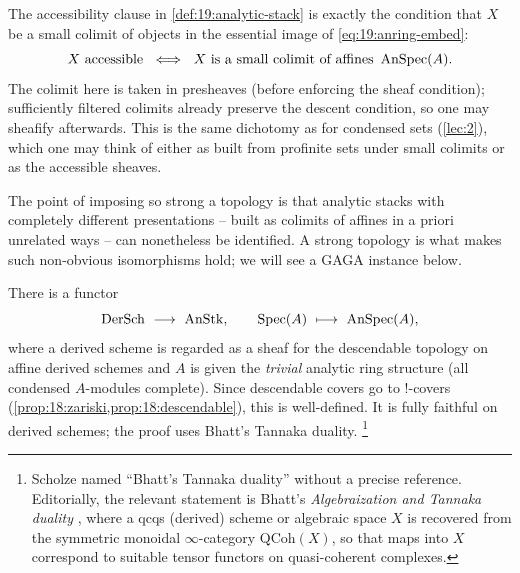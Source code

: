\begin{remark}
\label{rmk:19:accessible-colimit}
The accessibility clause in \cref{def:19:analytic-stack} is exactly the
condition that $X$ be a small colimit of objects in the essential image of
\eqref{eq:19:anring-embed}:
\begin{equation*}
X\ \text{accessible}\ \iff\ X\ \text{is a small colimit of affines }\operatorname{AnSpec}(A).
\end{equation*}
The colimit here is taken in presheaves (before enforcing the sheaf condition);
sufficiently filtered colimits already preserve the descent condition, so one may
sheafify afterwards. This is the same dichotomy as for condensed sets
(\cref{lec:2}), which one may think of either as built from profinite sets under
small colimits or as the accessible sheaves.
\end{remark}

The point of imposing so strong a topology is that analytic stacks with
completely different presentations -- built as colimits of affines in a priori
unrelated ways -- can nonetheless be identified. A strong topology is what makes
such non-obvious isomorphisms hold; we will see a GAGA instance below.

\begin{example}
\label{ex:19:derived-schemes}
There is a functor
\begin{equation}
\label{eq:19:dersch-to-anstk}
\operatorname{DerSch}\ \longrightarrow\ \operatorname{AnStk},\qquad
\operatorname{Spec}(A)\ \longmapsto\ \operatorname{AnSpec}(A),
\end{equation}
where a derived scheme is regarded as a sheaf for the descendable topology on
affine derived schemes and $A$ is given the \emph{trivial} analytic ring
structure (all condensed $A$-modules complete). Since descendable covers go to
$!$-covers (\cref{prop:18:zariski,prop:18:descendable}), this is well-defined. It is fully
faithful on derived schemes; the proof uses Bhatt's Tannaka duality.%
\footnote{Scholze named ``Bhatt's Tannaka duality'' without a precise reference.
Editorially, the relevant statement is Bhatt's \emph{Algebraization and Tannaka
duality} \cite{bhatt2014algebraizationtannakaduality}, where a
qcqs (derived) scheme or algebraic space $X$ is recovered from the symmetric
monoidal $\infty$-category $\mathrm{QCoh}(X)$, so that maps into $X$ correspond
to suitable tensor functors on quasi-coherent complexes.}
\end{example}

